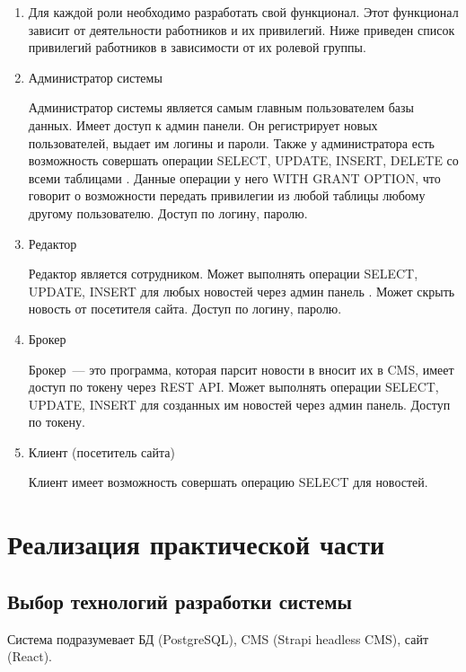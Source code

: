 \documentclass{mirea}
\begin{document}
	\begin{enumerate}
		\item[] Для каждой роли необходимо разработать свой функционал. Этот функционал зависит от деятельности
		работников и их привилегий. Ниже приведен список привилегий
		работников в зависимости от их ролевой группы.
		
		\item Администратор системы
		
		Администратор системы является самым главным
		пользователем базы данных. Имеет доступ к админ панели. Он регистрирует новых пользователей, выдает им логины и пароли. Также у администратора есть возможность совершать операции SELECT, UPDATE, INSERT, DELETE со всеми таблицами \cite{bib:stounz}\cite{bib:postgrespro}. Данные операции у него WITH GRANT OPTION, что говорит о возможности передать привилегии из любой таблицы любому другому пользователю. Доступ по логину, паролю.
		
		\item Редактор
		
		Редактор является сотрудником. Может выполнять операции SELECT, UPDATE, INSERT для любых новостей через админ панель \cite{bib:about}\cite{bib:metanit}. Может скрыть новость от посетителя сайта. Доступ по логину, паролю.
		
		\item Брокер
		
		Брокер~--- это программа, которая парсит новости в вносит их в CMS, имеет доступ по токену через REST API. Может выполнять операции SELECT, UPDATE, INSERT для созданных им новостей через админ панель. Доступ по токену.
		
		\item Клиент (посетитель сайта)
		
		Клиент имеет возможность совершать операцию SELECT для новостей.
		
	\end{enumerate}

	
	\section{Реализация практической части}
	
	\subsection{Выбор технологий разработки системы}
	
	Система подразумевает БД (PostgreSQL), CMS (Strapi headless CMS), сайт (React).
	
\end{document}
